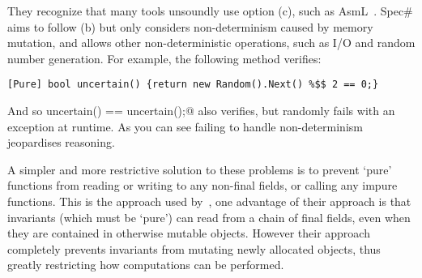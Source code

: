 They recognize that many tools unsoundly use option (c), such as AsmL~\cite{barnett2003runtime}.
Spec\# aims to follow (b) but only considers non-determinism caused by memory mutation, and allows other non-deterministic operations, such as I/O and random number generation. For example, the following method verifies:
\saveSpace
\begin{lstlisting}
[Pure] bool uncertain() {return new Random().Next() %$$ 2 == 0;}
\end{lstlisting}\saveSpace
And so \Q@assert uncertain() == uncertain();@ also verifies, but randomly fails with an exception at runtime.
As you can see failing to handle non-determinism jeopardises reasoning.

A simpler and more restrictive solution to these problems is to prevent `pure' functions from reading or writing to any non-final fields, or calling any impure functions. This is the approach used by~\cite{Flanagan06hybridtypes}, one advantage of their approach is that invariants (which must be `pure') can read from a chain of final fields, even when they are contained in otherwise mutable objects. However their approach completely prevents invariants from mutating newly allocated objects, thus greatly restricting how computations can be performed.
\saveSpace



















